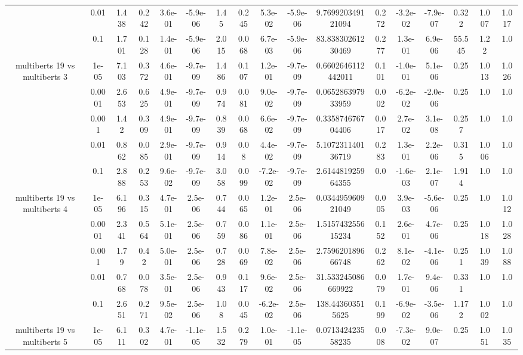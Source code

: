 \begin{tabular}{|c|c|c|c|c|c|c|c|c|c|c|c|c|c|c|c|c|}
 & 0.01 & 1.438 & 0.242 & 3.6e-01 & -5.9e-06 & 1.45 & 0.245 & 5.3e-02 & -5.9e-06 & 9.769920349121094 & 0.272 & -3.2e-02 & -7.9e-07 & 0.322 & 1.007 & 1.017 \\
 & 0.1 & 1.701 & 0.128 & 1.4e-01 & -5.9e-06 & 2.015 & 0.068 & 6.7e-03 & -5.9e-06 & 83.83830261230469 & 0.277 & 1.3e-01 & 6.9e-06 & 55.545 & 1.22 & 1.0 \\
\hline
\multirow{5}{*}{multiberts 19 vs multiberts 3} & 1e-05 & 7.103 & 0.372 & 4.6e-01 & -9.7e-09 & 1.486 & 0.107 & 1.2e-01 & -9.7e-09 & 0.6602646112442011 & 0.101 & -1.0e-01 & 5.1e-06 & 0.25 & 1.013 & 1.026 \\
 & 0.0001 & 2.653 & 0.625 & 4.9e-01 & -9.7e-09 & 0.974 & 0.081 & 9.0e-02 & -9.7e-09 & 0.065286397933959 & 0.002 & -6.2e-02 & -2.0e-06 & 0.25 & 1.0 & 1.0 \\
 & 0.001 & 1.42 & 0.309 & 4.9e-01 & -9.7e-09 & 0.839 & 0.068 & 6.6e-02 & -9.7e-09 & 0.335874676704406 & 0.017 & 2.7e-02 & 3.1e-08 & 0.257 & 1.0 & 1.0 \\
 & 0.01 & 0.862 & 0.085 & 2.9e-01 & -9.7e-09 & 0.914 & 0.08 & 4.4e-02 & -9.7e-09 & 5.107231140136719 & 0.283 & 1.3e-01 & 2.2e-06 & 0.315 & 1.006 & 1.0 \\
 & 0.1 & 2.888 & 0.253 & 9.6e-02 & -9.7e-09 & 3.058 & 0.099 & -7.2e-02 & -9.7e-09 & 2.614481925964355 & 0.0 & -1.6e-03 & 2.1e-07 & 1.914 & 1.0 & 1.0 \\
\hline
\multirow{5}{*}{multiberts 19 vs multiberts 4} & 1e-05 & 6.196 & 0.315 & 4.7e-01 & 2.5e-06 & 0.744 & 0.065 & 1.2e-01 & 2.5e-06 & 0.034495960921049 & 0.005 & 3.9e-03 & -5.6e-06 & 0.25 & 1.0 & 1.012 \\
 & 0.0001 & 2.341 & 0.564 & 5.1e-01 & 2.5e-06 & 0.759 & 0.086 & 1.1e-01 & 2.5e-06 & 1.515743255615234 & 0.152 & 2.6e-01 & 4.7e-06 & 0.25 & 1.018 & 1.028 \\
 & 0.001 & 1.79 & 0.42 & 5.0e-01 & 2.5e-06 & 0.728 & 0.069 & 7.8e-02 & 2.5e-06 & 2.759620189666748 & 0.262 & 8.1e-02 & -4.1e-06 & 0.251 & 1.039 & 1.088 \\
 & 0.01 & 0.768 & 0.078 & 3.5e-01 & 2.5e-06 & 0.943 & 0.117 & 9.6e-02 & 2.5e-06 & 31.533245086669922 & 0.079 & 1.7e-01 & 9.4e-06 & 0.331 & 1.0 & 1.0 \\
 & 0.1 & 2.651 & 0.271 & 9.5e-02 & 2.5e-06 & 1.08 & 0.045 & -6.2e-02 & 2.5e-06 & 138.443603515625 & 0.199 & -6.9e-02 & -3.5e-06 & 1.172 & 1.002 & 1.0 \\
\hline
\multirow{5}{*}{multiberts 19 vs multiberts 5} & 1e-05 & 6.111 & 0.302 & 4.7e-01 & -1.1e-05 & 1.532 & 0.279 & 1.0e-01 & -1.1e-05 & 0.071342423558235 & 0.008 & -7.3e-02 & 9.0e-07 & 0.25 & 1.051 & 1.035 \\

\end{tabular}
